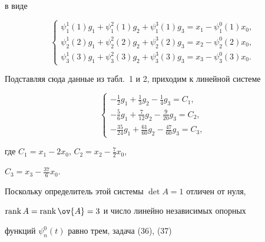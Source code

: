 \begin{exam}
в виде


\begin{equation}


\begin{cases}


\psi_1^1(1)g_1+\psi_1^2(1)g_2+\psi_1^3(1)g_3=


x_1-\psi_1^0(1)x_0,\\


\psi_2^1(2)g_1+\psi_2^2(2)g_2+\psi_2^3(2)g_3=


x_2-\psi_2^0(2)x_0,\\


\psi_3^1(3)g_1+\psi_3^2(3)g_2+\psi_3^3(3)g_3=x_3-\psi_3^0(3)x_0.


\end{cases}


\end{equation}


Подставляя сюда данные из табл.~1 и 2, приходим к линейной системе


\begin{equation} 


\begin{cases}






-\frac{1}{2}g_1+\frac{1}{3}g_2-\frac{1}{4}g_3 = C_1,\\


-\frac{5}{6}g_1+\frac{7}{12}g_2-\frac{9}{20}g_3 = C_2,\\


-\frac{35}{24}g_1+\frac{61}{60}g_2-\frac{47}{60}g_3 = C_3,






\end{cases}


\end{equation}


где $C_1=x_1-2x_0$, $C_2=x_2-\frac{7}{2}x_0$,


$C_3=x_3-\frac{37}{6}x_0$.





Поскольку определитель этой системы $\det A=1$ отличен от нуля,


$\rank A=\rank \ov{A}=3$ и число линейно независимых опорных


функций $\psi_n^0(t)$ равно трем, задача (36), (37)



\end{exam}
